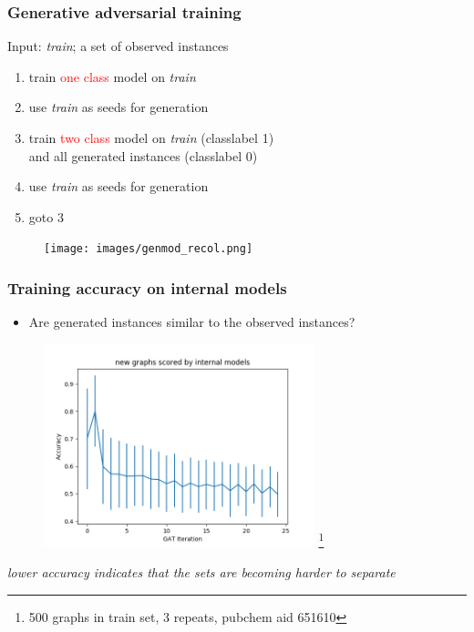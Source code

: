 \documentclass{beamer}
\newcommand{\red}[1]{\textcolor{red}{#1}}
\begin{document}
\begin{frame}
    \frametitle{Generative adversarial training}
    Input: \emph{train}; a set of observed  instances
    \begin{enumerate}

        \item train \red{one class} model on \emph{train}
        \item use \emph{train} as seeds for generation
        \item train \red{two class} model on \emph{train} (classlabel 1) \\
            and all generated instances (classlabel 0)
        \item use \emph{train} as seeds for generation
        \item goto 3
    \end{enumerate}
    \begin{figure}[ht]
        \centering
        \texttt{[image: images/genmod\_recol.png]}
    \end{figure}
\end{frame}



\begin{frame}
    \frametitle{Training accuracy on internal models}
    \begin{itemize}
        \item Are generated instances similar to the observed instances?
    \end{itemize}

   \begin{figure}[ht]
        \centering
        \includegraphics[width=0.70\textwidth]{images/eval2.png}
        \footnote{500 graphs in train set, 3 repeats, pubchem aid 651610}
    \end{figure}
   \small{\em lower accuracy indicates that the sets are becoming harder to separate}
\end{frame}
\end{document}
